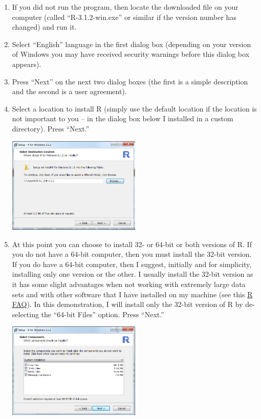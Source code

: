 \documentclass{article}\usepackage[]{graphicx}\usepackage[]{color}
\begin{document}
\begin{enumerate}
  \item If you did not run the program, then locate the downloaded file on your computer (called ``R-3.1.2-win.exe'' or similar if the version number has changed) and run it.

  \item Select ``English'' language in the first dialog box (depending on your version of Windows you may have received security warnings before this dialog box appears).

  \item Press ``Next'' on the next two dialog boxes (the first is a simple description and the second is a user agreement).

  \item Select a location to install R (simply use the default location if the location is not important to you -- in the dialog box below I installed in a custom directory).  Press ``Next.''
\begin{center}
  \includegraphics[width=2.5in]{Figs/R_Install_Directory.png}
\end{center}

  \item At this point you can choose to install 32- or 64-bit or both versions of R.  If you do not have a 64-bit computer, then you must install the 32-bit version.  If you do have a 64-bit computer, then I suggest, initially and for simplicity, installing only one version or the other.  I usually install the 32-bit version as it has some slight advantages when not working with extremely large data sets and with other software that I have installed on my machine (see this \href{http://streaming.stat.iastate.edu/CRAN/bin/windows/base/rw-FAQ.html#Should-I-run-32_002dbit-or-64_002dbit-R_003f}{R FAQ}).  In this demonstration, I will install only the 32-bit version of R by de-selecting the ``64-bit Files'' option.  Press ``Next.''
\begin{center}
  \includegraphics[width=2.5in]{Figs/R_Install_32Bit.png}
\end{center}


\end{enumerate}
\end{document}
